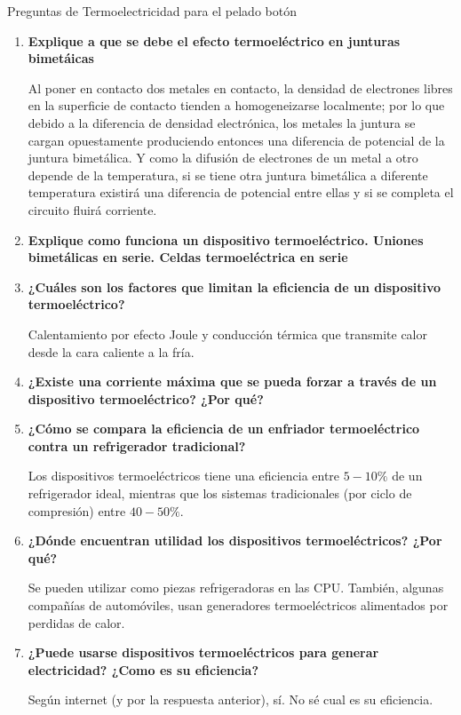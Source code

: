 \documentclass[a4paper,10pt,fleqn,oneside]{article}
\begin{document}


\bigskip
\noindent
\centering
Preguntas de Termoelectricidad para el pelado botón


\begin{enumerate}[1.]
	\item \textbf{Explique a que se debe el efecto termoeléctrico en junturas bimetáicas}

	Al poner en contacto dos metales en contacto, la densidad de electrones libres en la superficie de contacto tienden a homogeneizarse localmente; por lo que debido a la diferencia de densidad electrónica, los metales la juntura se cargan opuestamente produciendo entonces una diferencia de potencial de la juntura bimetálica. Y como la difusión de electrones de un metal a otro depende de la temperatura, si se tiene otra juntura bimetálica a diferente temperatura existirá una diferencia de potencial entre ellas y si se completa el circuito fluirá corriente. 

	\item \textbf{Explique como funciona un dispositivo termoeléctrico. Uniones bimetálicas en serie. Celdas termoeléctrica en serie}
	
	\item \textbf{¿Cuáles son los factores que limitan la eficiencia de un dispositivo termoeléctrico?}
	
	Calentamiento por efecto Joule y conducción térmica que transmite calor desde la cara caliente a la fría.
	
	\item \textbf{¿Existe una corriente máxima que se pueda forzar a través de un dispositivo termoeléctrico? ¿Por qué?}
	
	\item \textbf{¿Cómo se compara la eficiencia de un enfriador termoeléctrico contra un refrigerador tradicional?}
	
	Los dispositivos termoeléctricos tiene una eficiencia entre $5-10\%$ de un refrigerador ideal, mientras que los sistemas tradicionales (por ciclo de compresión) entre $40-50\%$.
	
	\item \textbf{¿Dónde encuentran utilidad los dispositivos termoeléctricos? ¿Por qué?}
	
	Se pueden utilizar como piezas refrigeradoras en las CPU. También, algunas compañías de automóviles,
usan generadores termoeléctricos alimentados por perdidas de calor.
	\item \textbf{¿Puede usarse dispositivos termoeléctricos para generar electricidad? ¿Como es su eficiencia?}
	
	Según internet (y por la respuesta anterior), sí. No sé cual es su eficiencia.
\end{enumerate}
\end{document}
